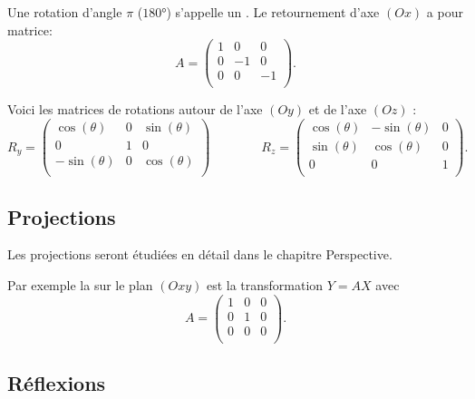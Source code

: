 \documentclass[11pt,class=report,crop=false]{standalone}
\begin{document}

Une rotation d'angle $\pi$ ($\ang{180}$) s'appelle un .
Le retournement d'axe $(Ox)$ a pour matrice:
 $$A = 
\begin{pmatrix}
1 & 0 & 0 \\
0 & -1 & 0\\
0 & 0 & -1 \\
\end{pmatrix}.$$


Voici les matrices de rotations autour de l'axe $(Oy)$ et de l'axe $(Oz)$ :
$$
R_y = 
\begin{pmatrix}
	\cos(\theta) & 0 & \sin(\theta) \\
	0 & 1 & 0 \\	
	-\sin(\theta) & 0 & \cos(\theta) \\
\end{pmatrix}
\qquad \qquad 
R_z = 
\begin{pmatrix}
	\cos(\theta) & - \sin(\theta) & 0 \\
	\sin(\theta) & \cos(\theta) & 0\\
	0 & 0 & 1 \\
\end{pmatrix}.$$



\subsection{Projections}


Les projections seront étudiées en détail dans le chapitre \og{}Perspective\fg{}.

Par exemple la  sur le plan $(Oxy)$ est la transformation $Y=AX$ avec
$$A = 
\begin{pmatrix}
	1 & 0 & 0 \\
	0 & 1 & 0 \\
	0 & 0 & 0 \\
\end{pmatrix}.$$



\subsection{Réflexions}
\end{document}

